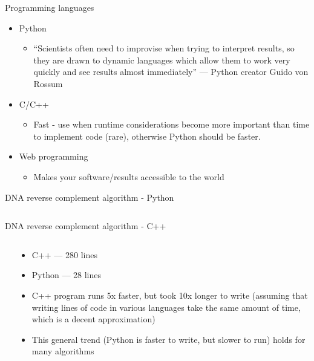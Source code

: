 \begin{frame}{Programming languages}
  \begin{itemize}
  \item Python
    \begin{itemize}
    \item ``Scientists often need to improvise when trying to interpret results, so they are drawn to dynamic languages which allow them to work very quickly and see results almost immediately'' --- Python creator Guido von Rossum
    \end{itemize}
    \pause
  \item C/C++
    \begin{itemize}
    \item Fast - use when runtime considerations
      become more important than time to implement code (rare), otherwise
      Python should be faster.
    \end{itemize}
    \pause
  \item Web programming
    \begin{itemize}
    \item Makes your software/results accessible to the world
    \end{itemize}
  \end{itemize}
\end{frame}

\begin{frame}{DNA reverse complement algorithm - Python}
  \tiny
  \inputminted{python}{code-snippets/reverse-complement.py}
\end{frame}

\begin{frame}{DNA reverse complement algorithm - C++}
  \begin{columns}[T]
    \begin{column}{0.2\textwidth}
      \fontsize{0.25mm}{0.25mm}\selectfont
      \inputminted{c++}{code-snippets/reverse-complement.cc}
    \end{column}
    \begin{column}{0.75\textwidth}
      \begin{itemize}
      \item C++ --- 280 lines
      \item Python --- 28 lines
      \item C++ program runs 5x faster, but took 10x longer to write
        (assuming that writing lines of code in various languages take
        the same amount of time, which is a decent approximation)
      \item This general trend (Python is faster to write, but slower to run)
        holds for many algorithms
      \end{itemize}
    \end{column}
  \end{columns}
\end{frame}